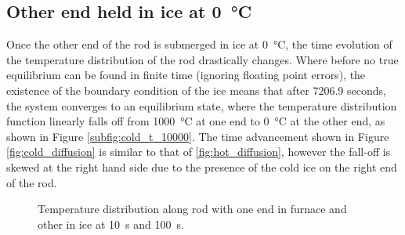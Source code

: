 \subsection{Other end held in ice at \SI{0}{\celsius}}
\label{subsec:cold}

Once the other end of the rod is submerged in ice at \SI{0}{\celsius}, the time evolution of the temperature distribution of the rod drastically changes. Where before no true equilibrium can be found in finite time (ignoring floating point errors), the existence of the boundary condition of the ice means that after 7206.9 seconds, the system converges to an equilibrium state, where the temperature distribution function linearly falls off from \SI{1000}{\celsius} at one end to \SI{0}{\celsius} at the other end, as shown in Figure \ref{subfig:cold_t_10000}. The time advancement shown in Figure \ref{fig:cold_diffusion} is similar to that of \ref{fig:hot_diffusion}, however the fall-off is skewed at the right hand side due to the presence of the cold ice on the right end of the rod.

\begin{figure}
    \centering
    \caption{Temperature distribution along rod with one end in furnace and other in ice at \SI{10}{\second} and \SI{100}{\second}.}
\end{figure}


